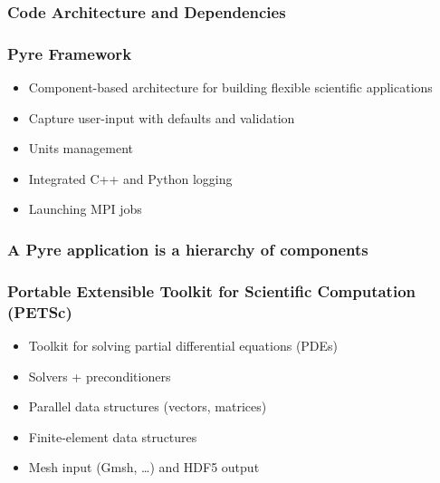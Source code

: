 \documentclass[aspectratio=169]{beamer}
\begin{document}
\begin{frame}
  \frametitle{Code Architecture and Dependencies}
  \summary{}


\end{frame}


\begin{frame}
  \frametitle{Pyre Framework}
  \summary{}

  \begin{minipage}{0.6\textwidth}
    \begin{itemize}
      \item Component-based architecture for building flexible scientific applications
      \item Capture user-input with defaults and validation
      \item Units management
      \item Integrated C++ and Python logging
      \item Launching MPI jobs
      \end{itemize}
  \end{minipage}
  \hfill
  \begin{minipage}{0.38\textwidth}
  \end{minipage}

\end{frame}


\begin{frame}
  \frametitle{A Pyre application is a hierarchy of components}
  \summary{}


\end{frame}


\begin{frame}
  \frametitle{Portable Extensible Toolkit for Scientific Computation (PETSc)}

  \begin{itemize}
    \item Toolkit for solving partial differential equations (PDEs)
    \item Solvers + preconditioners
    \item Parallel data structures (vectors, matrices)
    \item Finite-element data structures
    \item Mesh input (Gmsh, \ldots) and HDF5 output
  \end{itemize}

\end{frame}
\end{document}
